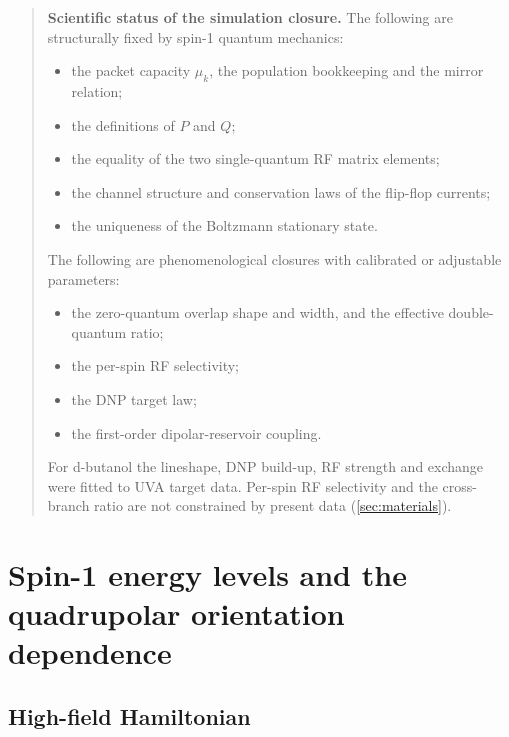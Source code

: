 \documentclass[11pt]{article}
\begin{document}
\begin{quote}
\textbf{Scientific status of the simulation closure.}  The following are structurally fixed by spin-1 quantum mechanics:
\begin{itemize}
  \item the packet capacity \(\mu_k\), the population bookkeeping and the mirror relation;
  \item the definitions of \(P\) and \(Q\);
  \item the equality of the two single-quantum RF matrix elements;
  \item the channel structure and conservation laws of the flip-flop currents;
  \item the uniqueness of the Boltzmann stationary state.
\end{itemize}
The following are phenomenological closures with calibrated or adjustable parameters:
\begin{itemize}
  \item the zero-quantum overlap shape and width, and the effective double-quantum ratio;
  \item the per-spin RF selectivity;
  \item the DNP target law;
  \item the first-order dipolar-reservoir coupling.
\end{itemize}
For d-butanol the lineshape, DNP build-up, RF strength and exchange were fitted to UVA target data.  Per-spin RF selectivity and the cross-branch ratio are not constrained by present data (\cref{sec:materials}).
\end{quote}

\section{Spin-1 energy levels and the quadrupolar orientation dependence}
\label{sec:levels}

\subsection{High-field Hamiltonian}
\end{document}
